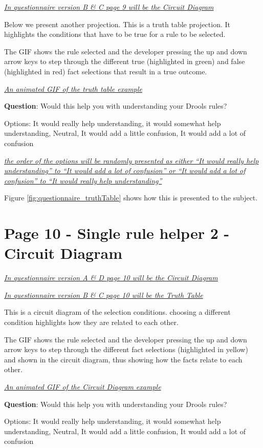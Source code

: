 \emph{\underline{In questionnaire version B \& C page 9 will be the Circuit Diagram}}

Below we present another projection.
This is a truth table projection.
It highlights the conditions that have to be true for a rule to be selected.

The GIF shows the rule selected and the developer pressing the up and down arrow keys to step through the different true (highlighted in green)  and false (highlighted in red) fact selections that result in a true outcome.

\emph{\underline{An animated GIF of the truth table example}}

\textbf{Question}: Would this help you with understanding your Drools rules?

Options: It would really help understanding, it would somewhat help understanding, Neutral, It would add a little confusion, It would add a lot of confusion

\emph{\underline{the order of the options will be randomly presented as either ``It would really help understanding'' to ``It would add a lot of confusion'' or ``It would add a lot of confusion'' to ``It would really help understanding''}}

Figure \ref{fig:questionnaire_truthTable} shows how this is presented to the subject.

\section{Page 10 - Single rule helper 2 - Circuit Diagram}
\emph{\underline{In questionnaire version A \& D page 10 will be the Circuit Diagram}}

\emph{\underline{In questionnaire version B \& C page 10 will be the Truth Table}}

This is a circuit diagram of the selection conditions.
choosing a different condition highlights how they are related to each other.

The GIF shows the rule selected and the developer pressing the up and down arrow keys to step through the different fact selections (highlighted in yellow) and shown in the circuit diagram, thus showing how the facts relate to each other.

\emph{\underline{An animated GIF of the Circuit Diagram example}}

\textbf{Question}: Would this help you with understanding your Drools rules?

Options: It would really help understanding, it would somewhat help understanding, Neutral, It would add a little confusion, It would add a lot of confusion

